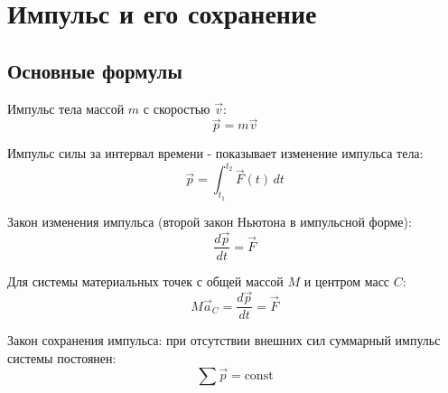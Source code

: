 \documentclass{article}
\begin{document}
\section*{Импульс и его сохранение}

\subsection*{Основные формулы}

Импульс тела массой $m$ с скоростью $\vec v$:
\[
\vec p = m\vec v
\]

Импульс силы за интервал времени - показывает изменение импульса тела:
\[
\vec p = \int_{t_1}^{t_2} \vec F(t)\,dt
\]

Закон изменения импульса (второй закон Ньютона в импульсной форме):
\[
\frac{d\vec p}{dt} = \vec F
\]

Для системы материальных точек с общей массой $M$ и центром масс $C$:
\[
M\vec a_C = \frac{d\vec p}{dt} = \vec F
\]

Закон сохранения импульса: при отсутствии внешних сил суммарный импульс системы постоянен:
\[
\sum \vec p = \text{const}
\]
\end{document}

